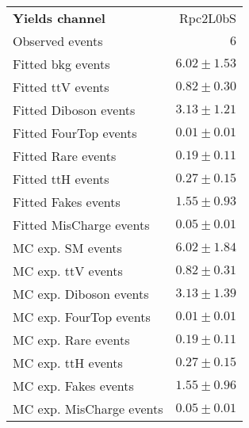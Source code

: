 

\begin{table}
\begin{center}
\setlength{\tabcolsep}{0.0pc}
{\small
\begin{tabular*}{\textwidth}{@{\extracolsep{\fill}}lr}
\noalign{\smallskip}\hline\noalign{\smallskip}
{\bfseries Yields channel}           & Rpc2L0bS              \\[-0.05cm]
\noalign{\smallskip}\hline\noalign{\smallskip}
Observed events          & $6$                    \\
\noalign{\smallskip}\hline\noalign{\smallskip}
Fitted bkg events         & $6.02 \pm 1.53$              \\
\noalign{\smallskip}\hline\noalign{\smallskip}
        Fitted ttV events         & $0.82 \pm 0.30$              \\
        Fitted Diboson events         & $3.13 \pm 1.21$              \\
        Fitted FourTop events         & $0.01 \pm 0.01$              \\
        Fitted Rare events         & $0.19 \pm 0.11$              \\
        Fitted ttH events         & $0.27 \pm 0.15$              \\
        Fitted Fakes events         & $1.55 \pm 0.93$              \\
        Fitted MisCharge events         & $0.05 \pm 0.01$              \\
 \noalign{\smallskip}\hline\noalign{\smallskip}
MC exp. SM events              & $6.02 \pm 1.84$              \\
\noalign{\smallskip}\hline\noalign{\smallskip}
        MC exp. ttV events         & $0.82 \pm 0.31$              \\
        MC exp. Diboson events         & $3.13 \pm 1.39$              \\
        MC exp. FourTop events         & $0.01 \pm 0.01$              \\
        MC exp. Rare events         & $0.19 \pm 0.11$              \\
        MC exp. ttH events         & $0.27 \pm 0.15$              \\
        MC exp. Fakes events         & $1.55 \pm 0.96$              \\
        MC exp. MisCharge events         & $0.05 \pm 0.01$              \\

\end{tabular*}}
\end{center}
\end{table}
